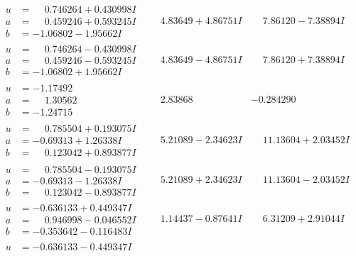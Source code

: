 \documentclass[1p]{elsarticle_modified}
\theoremstyle{definition}
\begin{document}
$$\begin{array}{c|c|c}
\begin{aligned}
u &= \phantom{-}0.746264 + 0.430998 I \\
a &= \phantom{-}0.459246 + 0.593245 I \\
b &= -1.06802 - 1.95662 I\end{aligned}
 & \phantom{-}4.83649 + 4.86751 I & \phantom{-}7.86120 - 7.38894 I \\ \hline\begin{aligned}
u &= \phantom{-}0.746264 - 0.430998 I \\
a &= \phantom{-}0.459246 - 0.593245 I \\
b &= -1.06802 + 1.95662 I\end{aligned}
 & \phantom{-}4.83649 - 4.86751 I & \phantom{-}7.86120 + 7.38894 I \\ \hline\begin{aligned}
u &= -1.17492\phantom{ +0.000000I} \\
a &= \phantom{-}1.30562\phantom{ +0.000000I} \\
b &= -1.24715\phantom{ +0.000000I}\end{aligned}
 & \phantom{-}2.83868\phantom{ +0.000000I} & -0.284290\phantom{ +0.000000I} \\ \hline\begin{aligned}
u &= \phantom{-}0.785504 + 0.193075 I \\
a &= -0.69313 + 1.26338 I \\
b &= \phantom{-}0.123042 + 0.893877 I\end{aligned}
 & \phantom{-}5.21089 - 2.34623 I & \phantom{-}11.13604 + 2.03452 I \\ \hline\begin{aligned}
u &= \phantom{-}0.785504 - 0.193075 I \\
a &= -0.69313 - 1.26338 I \\
b &= \phantom{-}0.123042 - 0.893877 I\end{aligned}
 & \phantom{-}5.21089 + 2.34623 I & \phantom{-}11.13604 - 2.03452 I \\ \hline\begin{aligned}
u &= -0.636133 + 0.449347 I \\
a &= \phantom{-}0.946998 - 0.046552 I \\
b &= -0.353642 - 0.116483 I\end{aligned}
 & \phantom{-}1.14437 - 0.87641 I & \phantom{-}6.31209 + 2.91044 I \\ \hline\begin{aligned}
u &= -0.636133 - 0.449347 I \\

\end{aligned}
\end{array}$$
\end{document}

